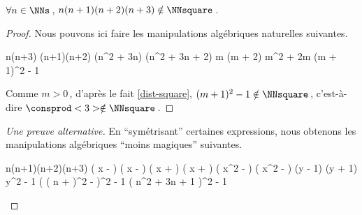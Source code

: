 \begin{fact} \label{case-3}
	 $\forall n \in \NNs$\,, $n(n+1)(n+2)(n+3) \notin \NNsquare$\,.
\end{fact}




\begin{proof}
    Nous pouvons ici faire les manipulations algébriques naturelles suivantes.
    
    \medskip
    
    \begin{stepcalc}[style = sar]
    \explnext{}
    	n(n+3) \cdot (n+1)(n+2)
    \explnext{}
    	(n^2 + 3n) \cdot (n^2 + 3n + 2)
    	m (m + 2)
    \explnext{}
    	m^2 + 2m
    \explnext{}
    	(m + 1)^2 - 1
    \end{stepcalc}
    
    \medskip
    
    Comme $m > 0$\,, d'après le fait \ref{dist-square}, $(m + 1)^2 - 1 \notin \NNsquare$\,, c'est-à-dire $\consprod<3> \notin \NNsquare$\,. 
\end{proof}




\begin{proof}[Une preuve alternative]
	En \enquote{symétrisant} certaines expressions, nous obtenons les manipulations algébriques \enquote{moins magiques} suivantes.
    
    \medskip
    
    \begin{stepcalc}[style = sar]
    \explnext{}
    	n(n+1)(n+2)(n+3)
    	\big( x -  \big) \big( x -  \big) \big( x +  \big) \big( x +  \big)
    \explnext{}
    	\big( x^2 -  \big) \big( x^2 -  \big)
    	(y - 1) (y + 1)
    \explnext{}
    	y^2 - 1
    \explnext{}
    	\Big( \big( n +  \big)^2 -  \Big)^2 - 1
    \explnext{}
    	\big( n^2 + 3n + 1 \big)^2 - 1
    \end{stepcalc}

	\vspace{-2ex}	
	\leavevmode
\end{proof}







